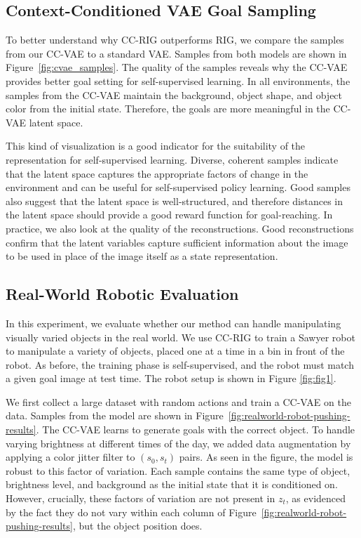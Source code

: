 \subsection{Context-Conditioned VAE Goal Sampling}

To better understand why CC-RIG outperforms RIG, we compare the samples from our CC-VAE to a standard VAE. Samples from both models are shown in Figure~\ref{fig:cvae_samples}.
The quality of the samples reveals why the CC-VAE provides better goal setting for self-supervised learning.
In all environments, the samples from the CC-VAE maintain the background, object shape, and object color from the initial state. Therefore, the goals are more meaningful in the CC-VAE latent space.

This kind of visualization is a good indicator for the suitability of the representation for self-supervised learning.
Diverse, coherent samples indicate that the latent space captures the appropriate factors of change in the environment and can be useful for self-supervised policy learning.
Good samples also suggest that the latent space is well-structured, and therefore distances in the latent space should provide a good reward function for goal-reaching. In practice, we also look at the quality of the reconstructions. Good reconstructions confirm that the latent variables capture sufficient information about the image to be used in place of the image itself as a state representation.

\subsection{Real-World Robotic Evaluation}
\label{sec:realworldexps}

In this experiment, we evaluate whether our method can handle manipulating visually varied objects in the real world. We use CC-RIG to train a Sawyer robot to manipulate a variety of objects, placed one at a time in a bin in front of the robot. As before, the training phase is self-supervised, and the robot must match a given goal image at test time. The robot setup is shown in Figure \ref{fig:fig1}.

We first collect a large dataset with random actions and train a CC-VAE on the data. Samples from the model are shown in Figure~\ref{fig:realworld-robot-pushing-results}.
The CC-VAE learns to generate goals with the correct object. To handle varying brightness at different times of the day, we added data augmentation by applying a color jitter filter to $(s_0, s_t)$ pairs.
As seen in the figure, the model is robust to this factor of variation. Each sample contains the same type of object, brightness level, and background as the initial state that it is conditioned on. However, crucially, these factors of variation are not present in $z_t$, as evidenced by the fact they do not vary within each column of Figure~\ref{fig:realworld-robot-pushing-results}, but the object position does.

